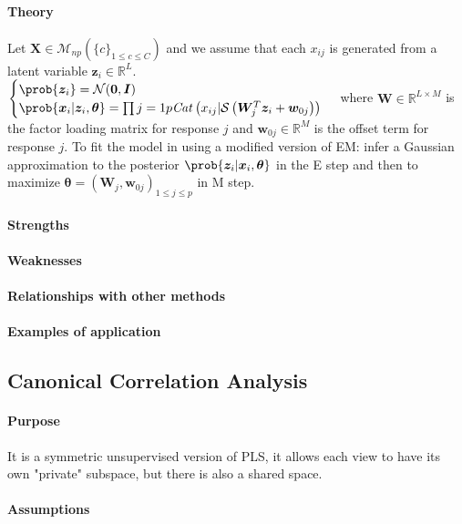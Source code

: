 \paragraph{Theory}
Let $\bm{X}\in\mathcal{M}_{np}(\{c\}_{1\leq c\leq C})$ and we assume that each $x_{ij}$
is generated from a latent variable $\bm{z}_{i}\in\mathbb{R}^{L}$.
$\begin{cases}
    \prob{\bm{z}_{i}} = \mathcal{N}(\bm{0}, \bm{I}) \\
    \prob{\bm{x}_{i}|\bm{z}_{i},\bm{\theta}} = \prod{j=1}{p}\text{\emph{Cat}}\left(
        x_{ij}|\mathcal{S}\left(\bm{W}_{j}^{T}\bm{z}_{i} + \bm{w}_{0j}\right)
    \right)
\end{cases}$
where $\bm{W}\in\mathbb{R}^{L\times M}$ is the factor loading matrix for response $j$ 
and $\bm{w}_{0j}\in\mathbb{R}^{M}$ is the offset term for response $j$.
To fit the model in using a modified version of EM: infer a Gaussian approximation to 
the posterior $\prob{\bm{z}_{i}|\bm{x}_{i},\bm{\theta}}$ in the E step and then to 
maximize $\bm{\theta} = \left(\bm{W}_{j},\bm{w}_{0j}\right)_{1\leq j\leq p}$ in M step.

\paragraph{Strengths}
\paragraph{Weaknesses}
\paragraph{Relationships with other methods}
\paragraph{Examples of application}

\subsection{Canonical Correlation Analysis}
\paragraph{Purpose}
It is a symmetric unsupervised version of PLS, it allows each view to have its own 
"private" subspace, but there is also a shared space.
\paragraph{Assumptions}

